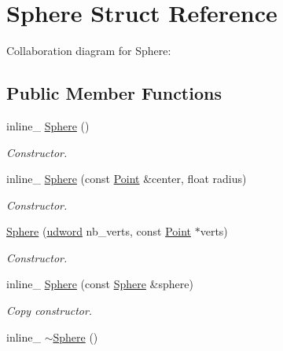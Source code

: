 \hypertarget{class_sphere}{\section{Sphere Struct Reference}
\label{class_sphere}
}


Collaboration diagram for Sphere\+:
\subsection*{Public Member Functions}
\begin{DoxyCompactItemize}
\item 
\hypertarget{class_sphere_aa2daf4997e9f4776d7559b5b048f2394}{inline\+\_\+ \hyperlink{class_sphere_aa2daf4997e9f4776d7559b5b048f2394}{Sphere} ()}\label{class_sphere_aa2daf4997e9f4776d7559b5b048f2394}

\begin{DoxyCompactList}\small\item\em Constructor. \end{DoxyCompactList}\item 
\hypertarget{class_sphere_a82acc3b6f865adc8b8a48b3dd1bb14a7}{inline\+\_\+ \hyperlink{class_sphere_a82acc3b6f865adc8b8a48b3dd1bb14a7}{Sphere} (const \hyperlink{class_point}{Point} \&center, float radius)}\label{class_sphere_a82acc3b6f865adc8b8a48b3dd1bb14a7}

\begin{DoxyCompactList}\small\item\em Constructor. \end{DoxyCompactList}\item 
\hypertarget{class_sphere_abe502767a9200bf880010c0321bfb251}{\hyperlink{class_sphere_abe502767a9200bf880010c0321bfb251}{Sphere} (\hyperlink{_ice_types_8h_a44c6f1920ba5551225fb534f9d1a1733}{udword} nb\+\_\+verts, const \hyperlink{class_point}{Point} $\ast$verts)}\label{class_sphere_abe502767a9200bf880010c0321bfb251}

\begin{DoxyCompactList}\small\item\em Constructor. \end{DoxyCompactList}\item 
\hypertarget{class_sphere_ab870c2e0a2ff480eeb0e1226e5322a01}{inline\+\_\+ \hyperlink{class_sphere_ab870c2e0a2ff480eeb0e1226e5322a01}{Sphere} (const \hyperlink{class_sphere}{Sphere} \&sphere)}\label{class_sphere_ab870c2e0a2ff480eeb0e1226e5322a01}

\begin{DoxyCompactList}\small\item\em Copy constructor. \end{DoxyCompactList}\item 
\hypertarget{class_sphere_ab99482050741f28aed9fb697c66ffaa4}{inline\+\_\+ \hyperlink{class_sphere_ab99482050741f28aed9fb697c66ffaa4}{$\sim$\+Sphere} ()}\label{class_sphere_ab99482050741f28aed9fb697c66ffaa4}


\end{DoxyCompactItemize}

